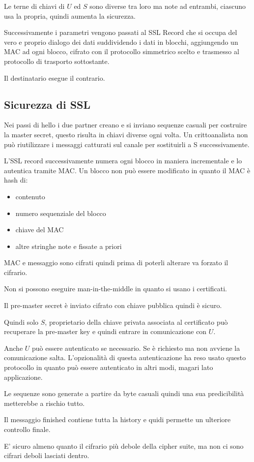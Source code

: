 Le terne di chiavi di $U$ ed $S$ sono diverse tra loro ma note ad entrambi, ciascuno usa la propria, quindi aumenta la sicurezza.

Successivamente i parametri vengono passati al SSL Record che si occupa del vero e proprio dialogo dei dati suddividendo i dati in blocchi, aggiungendo un MAC ad ogni blocco, cifrato con il protocollo simmetrico scelto e trasmesso al protocollo di trasporto sottostante.

Il destinatario esegue il contrario.

\subsection{Sicurezza di SSL}
Nei passi di hello i due partner creano e si inviano sequenze casuali per costruire la master secret, questo risulta in chiavi diverse ogni volta.
Un crittoanalista non può riutilizzare i messaggi catturati sul canale per sostituirli a S successivamente.

L'SSL record successivamente numera ogni blocco in maniera incrementale e lo autentica tramite MAC.
Un blocco non può essere modificato in quanto il MAC è hash di:
\begin{itemize}
    \item contenuto
    \item numero sequenziale del blocco
    \item chiave del MAC
    \item altre stringhe note e fissate a priori
\end{itemize}

MAC e messaggio sono cifrati quindi prima di poterli alterare va forzato il cifrario.

Non si possono eseguire man-in-the-middle in quanto si usano i certificati.

Il pre-master secret è inviato cifrato con chiave pubblica quindi è sicuro.

Quindi solo $S$, proprietario della chiave privata associata al certificato può recuperare la pre-master key e quindi entrare in comunicazione con $U$.

Anche $U$ può essere autenticato se necessario.
Se è richiesto ma non avviene la comunicazione salta.
L'opzionalità di questa autenticazione ha reso usato questo protocollo in quanto può essere autenticato in altri modi, magari lato applicazione.

Le sequenze sono generate a partire da byte casuali quindi una sua predicibilità metterebbe a rischio tutto.

Il messaggio finished contiene tutta la history e quidi permette un ulteriore controllo finale.

E' sicuro almeno quanto il cifrario più debole della cipher suite, ma non ci sono cifrari deboli lasciati dentro.

